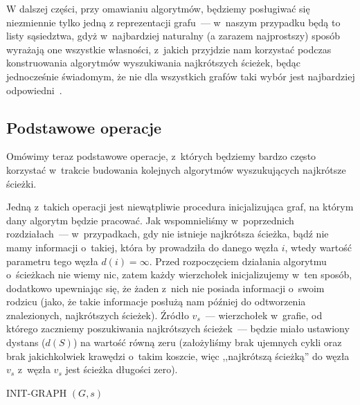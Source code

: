 W dalszej części, przy omawianiu algorytmów, będziemy posługiwać się niezmiennie tylko jedną z reprezentacji grafu~--- w~naszym przypadku będą to listy sąsiedztwa, gdyż w~najbardziej naturalny (a zarazem najprostszy) sposób wyrażają one wszystkie własności, z~jakich przyjdzie nam korzystać podczas konstruowania algorytmów wyszukiwania najkrótszych ścieżek, będąc jednocześnie świadomym, że nie dla wszystkich grafów taki wybór jest najbardziej odpowiedni~\cite[$1$]{eCOMPASS_TR_005}.



\subsection{Podstawowe operacje}



Omówimy teraz podstawowe operacje, z~których będziemy bardzo często korzystać w~trakcie budowania kolejnych algorytmów wyszukujących najkrótsze ścieżki.

Jedną z~takich operacji jest niewątpliwie procedura inicjalizująca graf, na którym dany algorytm będzie pracować.
Jak wspomnieliśmy w~poprzednich rozdziałach~--- w~przypadkach, gdy nie istnieje najkrótsza ścieżka, bądź nie mamy informacji o~takiej, która by prowadziła do danego węzła $i$, wtedy wartość parametru tego węzła $d \left( i \right) = \infty$.
Przed rozpoczęciem działania algorytmu o~ścieżkach nie wiemy nic, zatem każdy wierzchołek inicjalizujemy w~ten sposób, dodatkowo upewniając się, że żaden z~nich nie posiada informacji o~swoim rodzicu (jako, że takie informacje posłużą nam później do odtworzenia znalezionych, najkrótszych ścieżek).
Źródło $v_{s}$~--- wierzchołek w~grafie, od którego zaczniemy poszukiwania najkrótszych ścieżek~--- będzie miało ustawiony dystans ($d \left( S \right)$) na wartość równą zeru (założyliśmy brak ujemnych cykli oraz brak jakichkolwiek krawędzi o~takim koszcie, więc ,,najkrótszą ścieżką'' do węzła $v_{s}$ z~węzła $v_{s}$ jest ścieżka długości zero).

\begin{pseudokod}[!htbp]
	\DontPrintSemicolon
	\caption{
		INIT-GRAPH $\left( G, s \right)$
	}
	\label{alg:init-graph}
\end{pseudokod}


